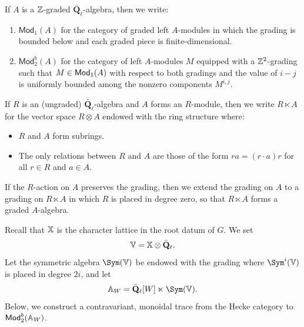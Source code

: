 \documentclass[a4paper,10pt,leqno]{amsart}
\theoremstyle{plain}
\theoremstyle{plain}
\theoremstyle{plain}
\theoremstyle{definition}
\theoremstyle{remark}
\newcommand{\Mod}{\mathsf{Mod}}
\newcommand{\QL}{\bar{\mathbf{Q}}_\ell}
\begin{document}
If $A$ is a $\bb{Z}$-graded $\QL$-algebra, then we write:
\begin{enumerate}
\item 	$\Mod_1(A)$ for the category of graded left $A$-modules in which the grading is bounded below and each graded piece is finite-dimensional.
\item 	$\Mod_2^b(A)$ for the category of left $A$-modules $M$ equipped with a $\bb{Z}^2$-grading such that $M \in \sf{Mod}_1(A)$ with respect to both gradings and the value of $i - j$ is uniformly bounded among the nonzero components $M^{i, j}$.
\end{enumerate}
If $R$ is an (ungraded) $\QL$-algebra and $A$ forms an $R$-module, then we write $R \ltimes A$ for the vector space $R \otimes A$ endowed with the ring structure where:
\begin{itemize}
\item 	$R$ and $A$ form subrings.
\item 	The only relations between $R$ and $A$ are those of the form $ra = (r \cdot a)r$ for all $r \in R$ and $a \in A$.
\end{itemize}
If the $R$-action on $A$ preserves the grading, then we extend the grading on $A$ to a grading on $R \ltimes A$ in which $R$ is placed in degree zero, so that $R \ltimes A$ forms a graded $A$-algebra.

Recall that $\bb{X}$ is the character lattice in the root datum of $G$.
We set
\begin{align}
\bb{V} = \bb{X} \otimes \QL.
\end{align}
Let the symmetric algebra $\Sym(\bb{V})$ be endowed with the grading where $\Sym^i(\bb{V})$ is placed in degree $2i$, and let
\begin{align}
\bb{A}_W = \QL[W] \ltimes \Sym(\bb{V}).
\end{align}
Below, we construct a contravariant, monoidal trace from the Hecke category to $\Mod_2^b(\bb{A}_W)$.

\subsection{}
\end{document}
